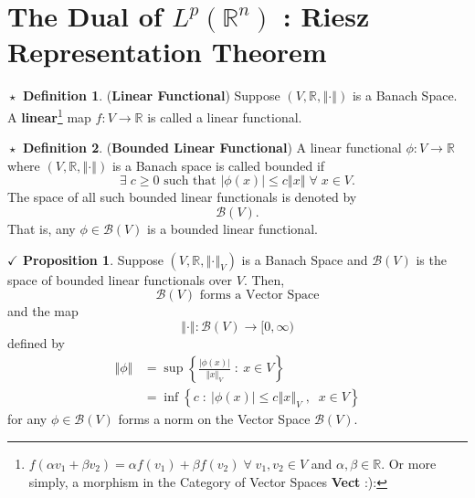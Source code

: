 \documentclass{article}
\theoremstyle{definition}
\newtheorem{definition}{$\boxed{\star}$ Definition}
\theoremstyle{remark}
\theoremstyle{definition}
\theoremstyle{definition}
\newtheorem{proposition}{$\checkmark$ Proposition}
\theoremstyle{definition}
\newcommand{\abs}[1]{\left \vert #1\right \vert}
\newcommand{\norm}[1]{\left \Vert #1 \right \Vert}
\newcommand{\R}{\mathbb{R}}
\newcommand{\alg}[1]{\mathscr{#1}}
\newcommand{\Lp}[1]{L^{p}\left (#1\right )}
\newcommand{\sblf}[1]{\alg{B}\left (#1\right )} %
\begin{document}
\section{The Dual of $ \Lp{\R^{n}} $ : Riesz Representation Theorem}
\begin{definition}
	(\textbf{Linear Functional}) Suppose $ (V,\R,\norm{\cdot})$ is a Banach Space. A \textbf{linear}\footnote{$ f(\alpha v_1 + \beta v_2) =  \alpha f(v_1) + \beta f(v_2) \;\forall \;v_1,v_2 \in V$ and $ \alpha,\beta \in \mathbb{R} $. Or more simply, a morphism in the Category of Vector Spaces \textbf{Vect} :):} map $f : V \longrightarrow \R  $ is called a linear functional.
\end{definition}
\hrulefill
\begin{definition}
	(\textbf{Bounded Linear Functional}) A linear functional $ \phi : V\longrightarrow\R $ where $ (V,\R,\norm{\cdot}) $ is a Banach space is called bounded if
	\[\exists\; c \ge 0 \text{ such that }\abs{\phi(x)} \le c\norm{x}\;\forall\;x\in V.\]
	The space of all such bounded linear functionals is denoted by
	\[\alg{B}(V).\]
	That is, any $ \phi \in \alg{B}(V) $ is a bounded linear functional.
\end{definition}
\hrulefill
\begin{proposition}
	Suppose $ (V,\R,\norm{\cdot}_V) $ is a Banach Space and $ \sblf{V} $ is the space of bounded linear functionals over $ V $. Then,
	\[\sblf{V}\text{ forms a Vector Space}\]
	and the map
	\[\norm{\cdot} : \sblf{V} \longrightarrow [0,\infty)\]
	defined by
	\begin{align*}
		\norm{\phi} &= \sup\left \{\frac{\abs{\phi(x)}}{\norm{x}_V} \;:\: x\in V\right \}\\
		&= \inf \left \{c\;:\: \abs{\phi(x)} \le c\norm{x}_V\;,\;\;x\in V\right \}
	\end{align*}
for any $ \phi \in \sblf{V} $ forms a norm on the Vector Space $ \sblf{V} $.
\end{proposition}
\end{document}
